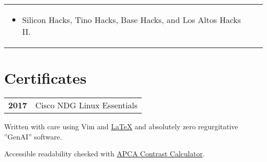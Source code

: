 \documentclass[lighthipster]{simplehipstercv}
\begin{document}
\begin{paracol}{2}
\begin{tabular}{p{} c}
{\begin{itemize}[leftmargin=4mm, itemsep=0.3mm]
            \item Silicon Hacks, Tino Hacks, Base Hacks, and Los Altos Hacks II.
        \end{itemize}
    }
  \end{tabular}
  \vspace{3em}


  \section*{Certificates}
  \begin{tabular}{>{\footnotesize\bfseries}r >{\footnotesize}p{}}
    2017 & Cisco NDG Linux Essentials
  \end{tabular}
  \bigskip

  \vfill{} %
  \vspace{26em}
  \vfill
  \begin{center}\fontfamily{\sfdefault}\selectfont \color{black!90}
    {
      \small
      Written with care using Vim and \href{https://github.com/izcet/latex-resume}{\LaTeX{}} and absolutely zero regurgitative ''GenAI'' software.

      Accessible readability checked with \href{http://www.myndex.com/APCA/}{APCA Contrast Calculator}.
    }
  \end{center}

  \vspace{4em}
\end{paracol}
\end{document}
